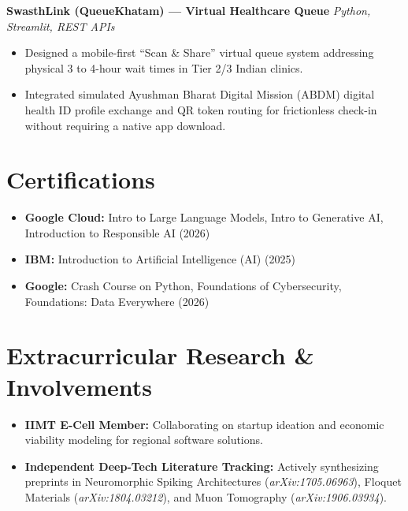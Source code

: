 \documentclass[10pt,a4paper]{article}
\begin{document}
\vspace{0.3em}
\textbf{SwasthLink (QueueKhatam) --- Virtual Healthcare Queue} \hfill \textit{Python, Streamlit, REST APIs}\\
\begin{itemize}
    \item Designed a mobile-first ``Scan \& Share'' virtual queue system addressing physical 3 to 4-hour wait times in Tier 2/3 Indian clinics.
    \item Integrated simulated Ayushman Bharat Digital Mission (ABDM) digital health ID profile exchange and QR token routing for frictionless check-in without requiring a native app download.
\end{itemize}

\section{Certifications}
\begin{itemize}
    \item \textbf{Google Cloud:} Intro to Large Language Models, Intro to Generative AI, Introduction to Responsible AI (2026)
    \item \textbf{IBM:} Introduction to Artificial Intelligence (AI) (2025)
    \item \textbf{Google:} Crash Course on Python, Foundations of Cybersecurity, Foundations: Data Everywhere (2026)
\end{itemize}

\section{Extracurricular Research \& Involvements}
\begin{itemize}
    \item \textbf{IIMT E-Cell Member:} Collaborating on startup ideation and economic viability modeling for regional software solutions.
    \item \textbf{Independent Deep-Tech Literature Tracking:} Actively synthesizing preprints in Neuromorphic Spiking Architectures (\textit{arXiv:1705.06963}), Floquet Materials (\textit{arXiv:1804.03212}), and Muon Tomography (\textit{arXiv:1906.03934}).
\end{itemize}
\end{document}
